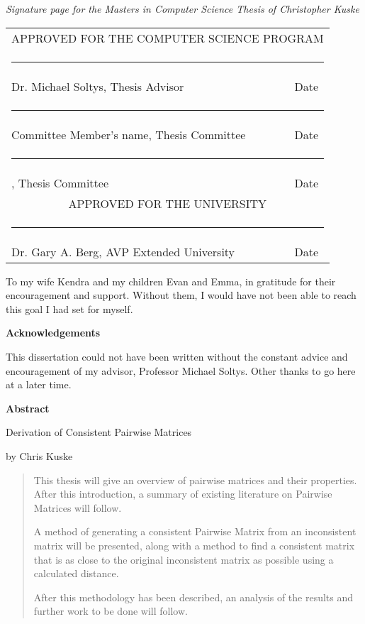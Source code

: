 \documentclass[12pt]{amsart}
\newcommand{\chairfaculty}{Dr. Michael Soltys}
\newcommand{\firstfaculty}{Committee Member's name}
\newcommand{\univefaculty}{Dr. Gary A. Berg}
\def\thesistitle{Derivation of Consistent Pairwise Matrices}
\def\name{Chris Kuske}
\newif \ifshort
\newcommand{\committee}[1]{\ifshort {\committeeshort} \else {\committeelong} \fi}
\newcommand{\committeeshort}{\vspace*{2.13in} \begin{tabular}{ll}
   \multicolumn{2}{c}{\hspace*{2.9cm} APPROVED FOR THE COMPUTER SCIENCE PROGRAM}\\[10mm]
   \multicolumn{2}{c}{\hspace*{1.65cm}\rule{4.5in}{.01in}}\\[-4mm]
   \hspace*{3cm}\chairfaculty, Thesis Advisor \hspace*{0cm}&  Date\\[4mm]
   \multicolumn{2}{c}{\hspace*{1.65cm}\rule{4.5in}{.01in}}\\[-4mm]
   \hspace*{3cm}\firstfaculty, Thesis Committee \hspace*{0cm}&  Date\\[17mm]
   \multicolumn{2}{c}{\hspace*{6.15cm} APPROVED FOR THE UNIVERSITY}\\[6mm]
   \multicolumn{2}{c}{\hspace*{1.9cm}\rule{4.5in}{.01in}}\\[-4mm]
   \hspace*{3cm}\univefaculty, AVP Extended University \hspace*{0cm}&  Date\\
 \end{tabular}}
\newcommand{\committeelong}{\vspace*{1.25in} \begin{tabular}{ll}
   \multicolumn{2}{c}{\hspace*{2.9cm} APPROVED FOR THE COMPUTER SCIENCE PROGRAM}\\[10mm]
   \multicolumn{2}{c}{\hspace*{1.65cm}\rule{4.5in}{.01in}}\\[-4mm]
   \hspace*{3cm}\chairfaculty, Thesis Advisor \hspace*{0cm}&  Date\\[4mm]
   \multicolumn{2}{c}{\hspace*{1.65cm}\rule{4.5in}{.01in}}\\[-4mm]
   \hspace*{3cm}\firstfaculty, Thesis Committee \hspace*{0cm}&  Date\\[17mm]
   \multicolumn{2}{c}{\hspace*{1.65cm}\rule{4.5in}{.01in}}\\[-4mm]
   \hspace*{3cm}\seconfaculty, Thesis Committee  &  Date\\[20mm]
   \multicolumn{2}{c}{\hspace*{6.15cm} APPROVED FOR THE UNIVERSITY}\\[6mm]
   \multicolumn{2}{c}{\hspace*{1.9cm}\rule{4.5in}{.01in}}\\[-4mm]
   \hspace*{3cm}\univefaculty, AVP Extended University \hspace*{0cm}&  Date\\
 \end{tabular}}
\theoremstyle{definition}
\begin{document}
\newpage
 \setlength{\paperheight}{13in}
 \setlength{\topmargin}{1.25cm}

{\center\emph{Signature page for the Masters in Computer Science Thesis of Christopher Kuske }}

\committee


 \newpage
 \setlength{\topmargin}{-0.4375in}
 \setlength{\paperheight}{11.5in}

\begin{center}
\vspace*{60mm}

To my wife Kendra and my children Evan and Emma, in gratitude for their encouragement and support. Without them, I would have not been able to reach this goal I had set for myself.

\end{center}


\newpage

\begin{center}
\vspace*{50mm}
{\bf Acknowledgements}
\end{center}

This dissertation could not have been written without the constant advice and encouragement of my advisor, Professor Michael Soltys.  Other thanks to go here at a later time.

\newpage
\pagestyle{plain}
 

{\bf Abstract}

\bigskip

\thesistitle

by
\name \bigskip
\begin{quote}

This thesis will give an overview of pairwise matrices and their properties. After this introduction, a summary of existing literature on Pairwise Matrices will follow.  

A method of generating a consistent Pairwise Matrix from an inconsistent matrix will be presented, along with a method to find a consistent matrix that is as close to the original inconsistent matrix as possible using a calculated distance.

After this methodology has been described, an analysis of the results and further work to be done will follow.
\end{quote} 
\end{document}

